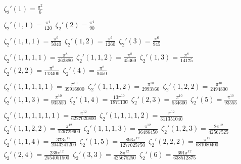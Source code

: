 \documentclass[12pt]{article}
\begin{document}
\begin{align*}
	& \zeta_2'(1) = \frac{\pi^2}{6} \\ \\
	& \zeta_2'(1,1) = \frac{\pi^4}{120}\ \ \zeta_2'(2) = \frac{\pi^4}{90} \\ \\
	& \zeta_2'(1,1,1) = \frac{\pi^6}{5040}\ \ \zeta_2'(1,2) = \frac{\pi^6}{1260}\ \ \zeta_2'(3) = \frac{\pi^6}{945} \\ \\
	& \zeta_2'(1,1,1,1) = \frac{\pi^8}{362880}\ \ \zeta_2'(1,1,2) = \frac{\pi^8}{45360}\ \ \zeta_2'(1,3) = \frac{\pi^8}{14175} \\ & \zeta_2'(2,2) = \frac{\pi^8}{113400}\ \ \zeta_2'(4) = \frac{\pi^8}{9450} \\ \\
	& \zeta_2'(1,1,1,1,1) = \frac{\pi^{10}}{39916800}\ \ \zeta_2'(1,1,1,2) = \frac{\pi^{10}}{2993760}\ \ \zeta_2'(1,2,2) = \frac{\pi^{10}}{2494800} \\ & \zeta_2'(1,1,3) = \frac{\pi^{10}}{935550}\ \ \zeta_2'(1,4) = \frac{13\pi^{10}}{1871100}\ \ \zeta_2'(2,3) = \frac{\pi^{10}}{534600}\ \ \zeta_2'(5) = \frac{\pi^{10}}{93555}
	\\ \\
	& \zeta_2'(1,1,1,1,1,1) = \frac{\pi^{12}}{6227020800} \ \ \zeta_2'(1,1,1,1,2) = \frac{\pi^{12}}{311351040} \\
	& \zeta_2'(1,1,2,2) = \frac{\pi^{12}}{129729600} \ \ \zeta_2'(1,1,1,3) = \frac{\pi^{12}}{36486450} \ \ \zeta_2'(1,2,3) = \frac{2\pi^{12}}{42567525} \\
	& \zeta_2'(1,1,4) = \frac{373\pi^{12}}{2043241200} \ \ \zeta_2'(1,5) = \frac{893\pi^{12}}{1277025750} \ \ \zeta_2'(2,2,2) = \frac{\pi^{12}}{681080400} \\
	& \zeta_2'(2,4) = \frac{239\pi^{12}}{2554051500} \ \ \zeta_2'(3,3) = \frac{8\pi^{12}}{425675250} \ \ \zeta_2'(6) = \frac{691\pi^{12}}{638512875}
\end{align*}
\end{document}
